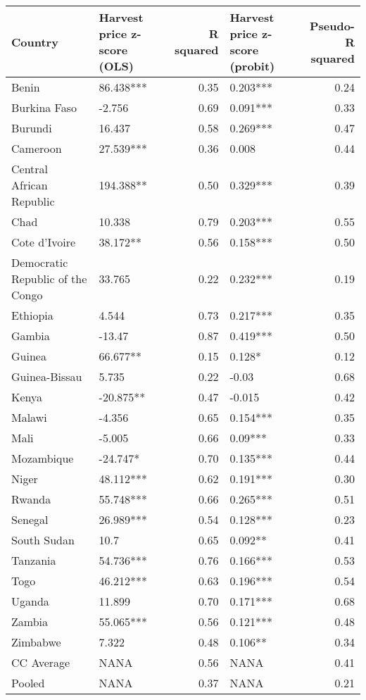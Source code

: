 \begin{table}[ht]
\centering
\begin{tabular}{llrlr}
  \hline
Country & Harvest price z-score (OLS) & R squared & Harvest price z-score (probit) & Pseudo-R squared \\ 
  \hline
Benin & 86.438*** & 0.35 & 0.203*** & 0.24 \\ 
  Burkina Faso & -2.756  & 0.69 & 0.091*** & 0.33 \\ 
  Burundi & 16.437  & 0.58 & 0.269*** & 0.47 \\ 
  Cameroon & 27.539*** & 0.36 & 0.008  & 0.44 \\ 
  Central African Republic & 194.388**  & 0.50 & 0.329*** & 0.39 \\ 
  Chad & 10.338  & 0.79 & 0.203*** & 0.55 \\ 
  Cote d'Ivoire & 38.172**  & 0.56 & 0.158*** & 0.50 \\ 
  Democratic Republic of the Congo & 33.765  & 0.22 & 0.232*** & 0.19 \\ 
  Ethiopia & 4.544  & 0.73 & 0.217*** & 0.35 \\ 
  Gambia & -13.47  & 0.87 & 0.419*** & 0.50 \\ 
  Guinea & 66.677**  & 0.15 & 0.128*  & 0.12 \\ 
  Guinea-Bissau & 5.735  & 0.22 & -0.03  & 0.68 \\ 
  Kenya & -20.875**  & 0.47 & -0.015  & 0.42 \\ 
  Malawi & -4.356  & 0.65 & 0.154*** & 0.35 \\ 
  Mali & -5.005  & 0.66 & 0.09*** & 0.33 \\ 
  Mozambique & -24.747*  & 0.70 & 0.135*** & 0.44 \\ 
  Niger & 48.112*** & 0.62 & 0.191*** & 0.30 \\ 
  Rwanda & 55.748*** & 0.66 & 0.265*** & 0.51 \\ 
  Senegal & 26.989*** & 0.54 & 0.128*** & 0.23 \\ 
  South Sudan & 10.7  & 0.65 & 0.092**  & 0.41 \\ 
  Tanzania & 54.736*** & 0.76 & 0.166*** & 0.53 \\ 
  Togo & 46.212*** & 0.63 & 0.196*** & 0.54 \\ 
  Uganda & 11.899  & 0.70 & 0.171*** & 0.68 \\ 
  Zambia & 55.065*** & 0.56 & 0.121*** & 0.48 \\ 
  Zimbabwe & 7.322  & 0.48 & 0.106**  & 0.34 \\ 
  CC Average & NANA & 0.56 & NANA & 0.41 \\ 
  Pooled & NANA & 0.37 & NANA & 0.21 \\ 
   \hline
\end{tabular}
\end{table}
